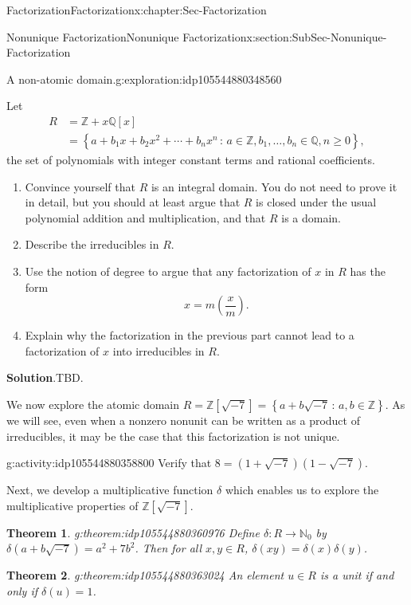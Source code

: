 \documentclass[oneside,10pt,]{book}
\newcommand{\blocktitlefont}{\relax}
\numberwithin{equation}{section}
\renewcommand{\ge}{\geqslant}
\newcommand{\setof}[2]{{\left\{#1\,\colon\,#2\right\}}}
\def\Z{{\mathbb Z}}
\def\Q{{\mathbb Q}}
\def\N{{\mathbb N}}
\newtheorem{theorem}{Theorem}[section]
\newcommand{\amp}{&}
\begin{document}
\begin{chapterptx}{Factorization}{}{Factorization}{}{}{x:chapter:Sec-Factorization}
\begin{sectionptx}{Nonunique Factorization}{}{Nonunique Factorization}{}{}{x:section:SubSec-Nonunique-Factorization}
\begin{exploration}{A non-atomic domain.}{g:exploration:idp105544880348560}
\par
Let%
\begin{align*}
R \amp = \Z + x\Q[x]\\
\amp = \setof{a + b_1 x + b_2 x^2 + \cdots + b_n x^n}{a\in \Z, b_1,\ldots, b_n \in \Q, n\ge 0},
\end{align*}
the set of polynomials with integer constant terms and rational coefficients.%
%
\begin{enumerate}
\item{}Convince yourself that \(R\) is an integral domain. You do not need to prove it in detail, but you should at least argue that \(R\) is closed under the usual polynomial addition and multiplication, and that \(R\) is a domain.%
\item{}Describe the irreducibles in \(R\).%
\item{}Use the notion of degree to argue that any factorization of \(x\) in \(R\) has the form%
\begin{equation*}
x = m\left(\frac{x}{m}\right).
\end{equation*}
%
\item{}Explain why the factorization in the previous part cannot lead to a factorization of \(x\) into irreducibles in \(R\).%
\end{enumerate}
\par\smallskip%
\noindent\textbf{\blocktitlefont Solution}.\hypertarget{g:solution:idp105544880357904}{}\quad{}TBD.\end{exploration}%
%
We now explore the atomic domain \(R = \Z[\sqrt{-7}] = \setof{a+b\sqrt{-7}}{a,b\in\Z}\). As we will see, even when a nonzero nonunit can be written as a product of irreducibles, it may be the case that this factorization is not unique.%
\begin{activity}{}{g:activity:idp105544880358800}%
Verify that \(8 = (1+\sqrt{-7})(1-\sqrt{-7})\).%
\end{activity}%
Next, we develop a multiplicative function \(\delta\) which enables us to explore the multiplicative properties of \(\Z[\sqrt{-7}]\).%
\begin{theorem}{}{}{g:theorem:idp105544880360976}%
Define \(\delta : R \to \N_0\) by \(\delta(a+b\sqrt{-7}) = a^2 + 7 b^2\). Then for all \(x,y\in R\), \(\delta(xy) = \delta(x)\delta(y)\).%
\end{theorem}
\begin{theorem}{}{}{g:theorem:idp105544880363024}%
An element \(u\in R\) is a unit if and only if \(\delta(u) = 1\).%

\end{theorem}
\end{sectionptx}
\end{chapterptx}
\end{document}
